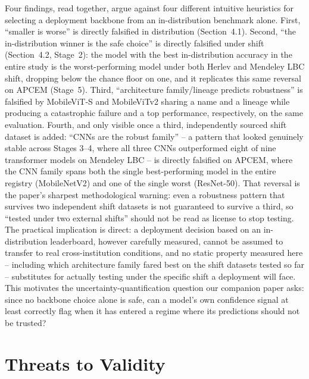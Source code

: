 \documentclass[runningheads]{llncs}
\begin{document}
Four findings, read together, argue against four different intuitive
heuristics for selecting a deployment backbone from an in-distribution
benchmark alone. First, ``smaller is worse'' is directly falsified in
distribution (Section~4.1). Second, ``the in-distribution winner is the
safe choice'' is directly falsified under shift (Section~4.2, Stage~2):
the model with the best in-distribution accuracy in the entire study is
the worst-performing model under both Herlev and Mendeley LBC shift,
dropping below the chance floor on one, and it replicates this same
reversal on APCEM (Stage~5). Third, ``architecture family/lineage
predicts robustness'' is falsified by MobileViT-S and MobileViTv2 sharing
a name and a lineage while producing a catastrophic failure and a top
performance, respectively, on the same evaluation. Fourth, and only
visible once a third, independently sourced shift dataset is added:
``CNNs are the robust family'' -- a pattern that looked genuinely stable
across Stages 3--4, where all three CNNs outperformed eight of nine
transformer models on Mendeley LBC -- is directly falsified on APCEM,
where the CNN family spans both the single best-performing model in the
entire registry (MobileNetV2) and one of the single worst (ResNet-50).
That reversal is the paper's sharpest methodological warning: even a
robustness pattern that survives two independent shift datasets is not
guaranteed to survive a third, so ``tested under two external shifts''
should not be read as license to stop testing. The practical implication
is direct: a deployment decision based on an in-distribution leaderboard,
however carefully measured, cannot be assumed to transfer to real
cross-institution conditions, and no static property measured here --
including which architecture family fared best on the shift datasets
tested so far -- substitutes for actually testing under the specific
shift a deployment will face. This motivates the uncertainty-quantification
question our companion paper asks: since no backbone choice alone is
safe, can a model's own confidence signal at least correctly flag when it
has entered a regime where its predictions should not be trusted?

\section{Threats to Validity}
\end{document}

